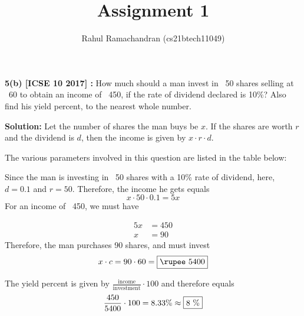 \documentclass[journal,12pt,twocolumn]{IEEEtran}
\begin{document}
\title{Assignment 1}
\author{Rahul Ramachandran (cs21btech11049)}
\maketitle

\begin{flushleft}
\textbf{5(b) [ICSE 10 2017] :} How much should a man invest in \rupee~50 shares selling at \rupee~60 to obtain an income of \rupee~450, if the rate of dividend declared is 10\%? Also find his yield percent, to the nearest whole number.
\vspace{3mm}

\textbf{Solution:} Let the number of shares the man buys be \(x\). If the shares are worth \(r\) and the dividend is \(d\), then the income is given by \( x \cdot r \cdot d \).

The various parameters involved in this question are listed in the table below:
\begin{table}[ht!]
    
\end{table}


Since the man is investing in \rupee~50 shares with a 10\% rate of dividend, here, \(d = 0.1 \) and \( r = 50 \). Therefore, the income he gets equals \[ x\cdot 50 \cdot 0.1 = 5x\]
For an income of \rupee~450, we must have

 \begin{align*}
     5x &= 450 \\
      x &= 90  
\end{align*}
Therefore, the man purchases 90 shares, and must invest \[ x \cdot c = 90 \cdot 60 = \fbox{\text{\rupee~5400}}\]

\vspace{3mm}
The yield percent is given by \( \displaystyle{\frac{\text{income}}{\text{investment}}} \cdot 100 \) and therefore equals \[ \frac{450}{5400} \cdot 100 = 8.33\% \approx \fbox{8 \%} \] 

\end{flushleft}
\end{document}
